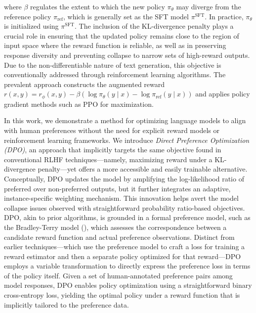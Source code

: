 where $\beta$ regulates the extent to which the new policy $\pi_\theta$ may diverge from the reference policy $\pi_\text{ref}$, which is generally set as the SFT model $\pi^\text{SFT}$. In practice, $\pi_\theta$ is initialized using $\pi^\text{SFT}$. The inclusion of the KL-divergence penalty plays a crucial role in ensuring that the updated policy remains close to the region of input space where the reward function is reliable, as well as in preserving response diversity and preventing collapse to narrow sets of high-reward outputs. Due to the non-differentiable nature of text generation, this objective is conventionally addressed through reinforcement learning algorithms. The prevalent approach \citep{ziegler2020finetuning, stiennon2022learning, bai2022training, ouyang2022training} constructs the augmented reward $r(x, y) = r_{\phi}(x, y) -\beta (\log \pi_{\theta}(y\mid x) - \log \pi_\text{ref}(y\mid x))$ and applies policy gradient methods such as PPO \cite{schulman2017proximal} for maximization.

In this work, we demonstrate a method for optimizing language models to align with human preferences without the need for explicit reward models or reinforcement learning frameworks. We introduce \textit{{Direct Preference Optimization} (DPO)}, an approach that implicitly targets the same objective found in conventional RLHF techniques—namely, maximizing reward under a KL-divergence penalty—yet offers a more accessible and easily trainable alternative. Conceptually, DPO updates the model by amplifying the log-likelihood ratio of preferred over non-preferred outputs, but it further integrates an adaptive, instance-specific weighting mechanism. This innovation helps avert the model collapse issues observed with straightforward probability ratio-based objectives. DPO, akin to prior algorithms, is grounded in a formal preference model, such as the Bradley-Terry model (\cite{bradley1952rankanalysis}), which assesses the correspondence between a candidate reward function and actual preference observations. Distinct from earlier techniques—which use the preference model to craft a loss for training a reward estimator and then a separate policy optimized for that reward—DPO employs a variable transformation to directly express the preference loss in terms of the policy itself. Given a set of human-annotated preference pairs among model responses, DPO enables policy optimization using a straightforward binary cross-entropy loss, yielding the optimal policy under a reward function that is implicitly tailored to the preference data.

